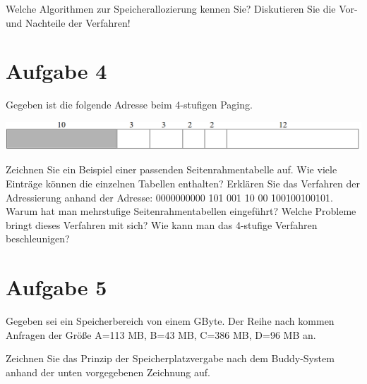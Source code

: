 Welche Algorithmen zur Speicherallozierung kennen Sie? Diskutieren Sie die Vor-
und Nachteile der Verfahren!

\section{Aufgabe 4}

Gegeben ist die folgende Adresse beim 4-stufigen Paging.

\includegraphics[width=\textwidth]{assets/uebungsblatt_3_task_4.png}

Zeichnen Sie ein Beispiel einer passenden Seitenrahmentabelle auf. Wie viele
Einträge können die einzelnen Tabellen enthalten? Erklären Sie das Verfahren
der Adressierung anhand der Adresse: 0000000000 101 001 10 00 100100100101.
Warum hat man mehrstufige Seitenrahmentabellen eingeführt? Welche Probleme
bringt dieses Verfahren mit sich? Wie kann man das 4-stufige Verfahren
beschleunigen?

\section{Aufgabe 5}

Gegeben sei ein Speicherbereich von einem GByte. Der Reihe nach kommen Anfragen
der Größe A=113 MB, B=43 MB, C=386 MB, D=96 MB an.

Zeichnen Sie das Prinzip der Speicherplatzvergabe nach dem Buddy-System anhand
der unten vorgegebenen Zeichnung auf.

